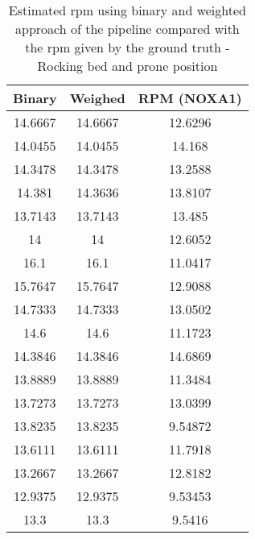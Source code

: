 \begin{table}[h]
    \centering
    \begin{tabular}{|c|c|c|}
 
    \hline 
    Binary & Weighed & RPM (NOXA1) \\  
\hline 
14.6667   &   14.6667  &    12.6296 \\ 
14.0455    &  14.0455  &     14.168 \\ 
14.3478    &  14.3478 &     13.2588 \\ 
14.381    &  14.3636  &    13.8107 \\ 
13.7143   &   13.7143  &    13.485 \\ 
14       &    14    &  12.6052 \\ 
16.1      &   16.1   &   11.0417 \\ 
15.7647   &   15.7647   &   12.9088 \\ 
14.7333   &   14.7333    &  13.0502 \\ 
14.6      &   14.6  &    11.1723 \\ 
14.3846   &   14.3846  &    14.6869 \\ 
13.8889    &  13.8889  &    11.3484 \\ 
13.7273   &   13.7273   &  13.0399 \\ 
13.8235   &   13.8235  &    9.54872 \\ 
13.6111   &   13.6111   &   11.7918 \\ 
13.2667   &   13.2667   &   12.8182 \\ 
12.9375   &   12.9375   &   9.53453 \\ 
13.3     &    13.3     &  9.5416 \\ 
\hline 
\end{tabular}
\caption{Estimated rpm using binary and weighted approach of the pipeline compared with the rpm given by the ground truth - Rocking bed and prone position}
\label{tab:ProneRockingsg}

\end{table}